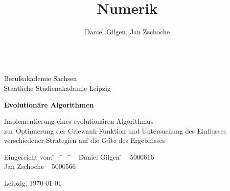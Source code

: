 \documentclass[12pt,
    a4paper,
    headinclude,
    footinclude]{scrartcl}
\author{Daniel Gilgen, Jan Zschoche}
\title{Numerik}
\begin{document}
	\onehalfspacing
	\monthyearsepgerman{\,}{\,}
	\setcounter{tocdepth}{2}
	
	\begin{titlepage}
	
		\begin{center}
			~\\[0.0cm]
			Berufsakademie Sachsen \\
			Staatliche Studienakadamie Leipzig \\[5cm]
			
			\begin{huge}
				\textbf{Evolutionäre Algorithmen} \\[2cm]
			\end{huge}
			
			\doublespacing
			
			Implementierung eines evolutionären Algorithmus \\
			zur Optimierung der Griewank-Funktion und Untersuchung des Einflusses\\
			 verschiedener Strategien auf die Güte des Ergebnisses\\[3.0cm]
		\end{center}
		
		\onehalfspacing
		\begin{tabbing}
			Eingereicht von: \= ~ \= ~ \= ~ \= Daniel Gilgen \= ~ 5000616\\
			\> \> \> \> Jan Zschoche \> ~ 5000566\\
		\end{tabbing}
		\vspace*{\fill}
		Leipzig, \today
		
	\end{titlepage}
    
    \setcounter{page}{1}
    
	
\end{document}
